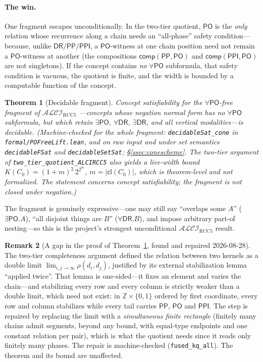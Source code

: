 \documentclass[11pt]{article}
\newcommand{\ALCIRCC}[1]{\mathcal{ALCI}_{\mathrm{RCC#1}}}
\newcommand{\DR}{\mathsf{DR}}
\newcommand{\PO}{\mathsf{PO}}
\newcommand{\PP}{\mathsf{PP}}
\newcommand{\PPI}{\mathsf{PPI}}
\newcommand{\code}[1]{\texttt{#1}}
\newcommand{\cl}{\ensuremath{\mathsf{cl}}}
\newcommand{\comp}{\ensuremath{\mathsf{comp}}}
\theoremstyle{plain}
\newtheorem{theorem}{Theorem}
\theoremstyle{definition}
\newtheorem{remark}[theorem]{Remark}
\begin{document}
\paragraph{The win.} One fragment escapes unconditionally. In the two-tier
quotient, $\PO$ is the \emph{only} relation whose recurrence along a chain
needs an ``all-phase'' safety condition---because, unlike $\DR/\PP/\PPI$,
a $\PO$-witness at one chain position need not remain a $\PO$-witness at
another (the compositions $\comp(\PP,\PO)$ and $\comp(\PPI,\PO)$ are not
singletons). If the concept contains \emph{no} $\forall\PO$ subformula,
that safety condition is vacuous, the quotient is finite, and the width is
bounded by a computable function of the concept.

\begin{theorem}[Decidable fragment]\label{thm:pofree}
Concept satisfiability for the $\forall\PO$-free fragment of $\ALCIRCC{5}$
---concepts whose negation normal form has no $\forall\PO$ subformula, but
which retain $\exists\PO$, $\forall\DR$, $\exists\DR$, and all vertical
modalities---is decidable.
\textup{(Machine-checked for the whole fragment: \code{decidableSat\_cone}
in \texttt{formal/POFreeLift.lean}, and on raw input and under set semantics
\code{decidableFSat} and \code{decidableSetSat}; \S\ref{ssec:conescheme}.
The two-tier argument of \texttt{two\_tier\_quotient\_ALCIRCC5} also yields a
live-width bound $K(C_0)=(1+m)^2\,2^{2^{m}}$, $m=|\cl(C_0)|$, which is
theorem-level and not formalized. The statement concerns concept
satisfiability; the fragment is not closed under negation.)}
\end{theorem}

The fragment is genuinely expressive---one may still say ``overlaps some
$A$'' ($\exists\PO.A$), ``all disjoint things are $B$''
($\forall\DR.B$), and impose arbitrary part-of nesting---so this is the
project's strongest unconditional $\ALCIRCC{5}$ result.

\begin{remark}[A gap in the proof of Theorem~\ref{thm:pofree}, found and
repaired 2026-08-28]\label{rem:pofree-gap}
The two-tier completeness argument defined the relation between two kernels as a
double limit $\lim_{i,j\to\infty}\rho(d_i,d_j)$, justified by its external
stabilization lemma ``applied twice''. That lemma is one-sided---it fixes an
element and varies the chain---and stabilizing every row and every column is
strictly weaker than a double limit, which need not exist: in
$\mathbb{Z}\times\{0,1\}$ ordered by first coordinate, every row and column
stabilizes while every tail carries $\PP$, $\PO$ and $\PPI$. The step is
repaired by replacing the limit with a \emph{simultaneous finite rectangle}
(finitely many chains admit segments, beyond any bound, with equal-type endpoints
and one constant relation per pair), which is what the quotient needs since it
reads only finitely many phases. The repair is machine-checked
(\code{fused\_kq\_all}). The theorem and its bound are unaffected.
\end{remark}
\end{document}

